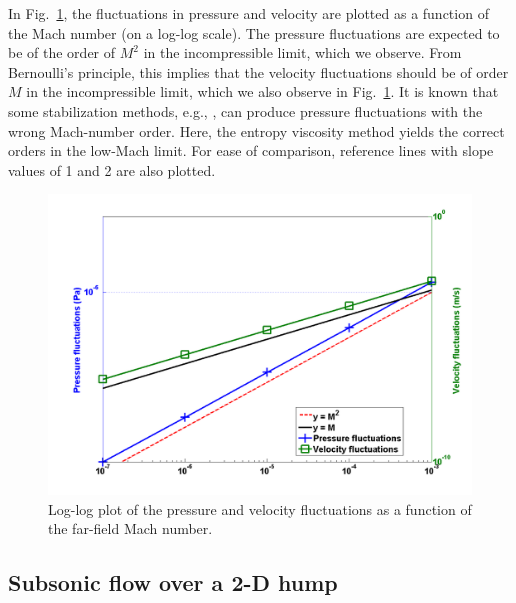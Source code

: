 \documentclass[preprint,10pt]{elsarticle}
\newcommand{\fig}[1]{Fig.~\ref{#1}}                      %
\newcommand{\tcr}[1]{\textcolor{red}{#1}}
\newcommand{\tcb}[1]{\textcolor{blue}{#1}}
\begin{document}
%
In \fig{fig:pressure_vel_fluc}, the fluctuations in pressure and velocity are plotted as a function of the 
Mach number (on a log-log scale). The pressure fluctuations are expected to be of the order of $M^2$ in the incompressible limit, 
which we observe. From Bernoulli's principle, this implies that the velocity fluctuations should be of order $M$ 
in the incompressible limit, which we also observe in \fig{fig:pressure_vel_fluc}. 
It is known that some stabilization methods, e.g., \cite{LowMach1, LowMach2, LowMach3}, 
can produce pressure fluctuations with the wrong Mach-number order. Here, the entropy viscosity method yields 
the correct orders in the low-Mach limit. For ease of comparison, reference lines with slope values of 1 and 2 are also plotted.
%
\begin{figure}[H]
\centering
\includegraphics[width=\textwidth]{pressure_fluctuation.png}
\caption{Log-log plot of the pressure and velocity fluctuations as a function of the far-field Mach number.}
\label{fig:pressure_vel_fluc}
\end{figure}

\subsection{Subsonic flow over a 2-D hump} \label{sec:hump}
\end{document}
